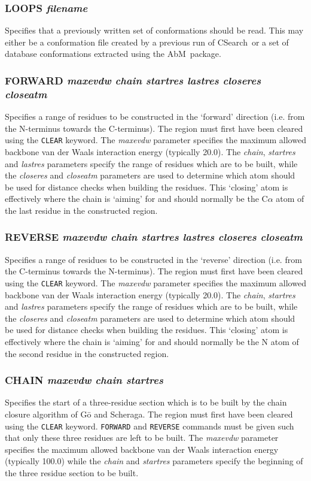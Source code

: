 \documentclass{report}
\newcommand{\cs}{CSearch}
\newcommand{\abm}{AbM}
\begin{document}
\subsubsection{LOOPS {\em filename}}
Specifies that a previously written set of conformations should be read. This
may either be a conformation file created by a previous run of \cs\ or a 
set of database conformations extracted using the \abm\ package.

\subsubsection{FORWARD {\em maxevdw chain startres lastres closeres closeatm}}
Specifies a range of residues to be constructed in the `forward' direction
(i.e. from the N-terminus towards the C-terminus). 
The region must first have been cleared using the {\tt CLEAR} keyword.
The {\em maxevdw\/} 
parameter specifies the maximum allowed backbone van der Waals interaction
energy (typically 20.0). 
The {\em chain}, {\em startres\/} and {\em lastres\/} parameters
specify the range of residues which are to be built, while the {\em closeres\/}
and {\em closeatm\/} parameters are used to determine which atom should be
used for distance checks when building the residues. This `closing' atom is
effectively where the chain is `aiming' for and should normally be the
C$\alpha$ atom of the last residue in the constructed region.

\subsubsection{REVERSE {\em maxevdw chain startres lastres closeres closeatm}}
Specifies a range of residues to be constructed in the `reverse' direction
(i.e. from the C-terminus towards the N-terminus). 
The region must first have been cleared using the {\tt CLEAR} keyword.
The {\em maxevdw\/} 
parameter specifies the maximum allowed backbone van der Waals interaction
energy (typically 20.0). 
The {\em chain}, {\em startres\/} and {\em lastres\/} parameters
specify the range of residues which are to be built, while the {\em closeres\/}
and {\em closeatm\/} parameters are used to determine which atom should be
used for distance checks when building the residues. This `closing' atom is
effectively where the chain is `aiming' for and should normally be the
N atom of the second residue in the constructed region.


\subsubsection{CHAIN {\em maxevdw chain startres}}
Specifies the start of a three-residue section which is to be built by the
chain closure algorithm of G\={o} and Scheraga\cite{go:closure}. 
The region must first have been cleared using the {\tt CLEAR} keyword.
{\tt FORWARD} and {\tt REVERSE}
commands must be given such that only these three residues are left to be
built. The {\em maxevdw\/} parameter specifies the maximum allowed backbone 
van der Waals interaction energy (typically 100.0) while the {\em chain} 
and {\em startres\/} parameters specify the beginning of the three residue 
section to be built.
\end{document}
